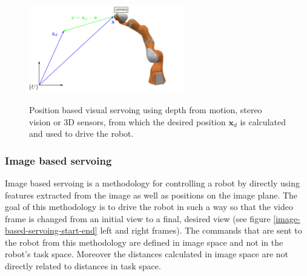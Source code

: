 \begin{center}
\begin{figure}[H]
\centering
\includegraphics[width=0.6\textwidth]{images/visual-servoing-position-based2.png}\\
\caption{Position based visual servoing using depth from motion, stereo vision or 3D sensors, from which the desired position $\mathbf{x}_d$ is calculated and 
used to drive the robot.}
\end{figure}
\end{center}

\subsubsection{Image based servoing}

Image based servoing is a methodology for controlling a robot by directly using features extracted from the image as well as positions on the image plane. The goal of this methodology is 
to drive the robot in such a way so that the video frame is changed from an initial view to a final, desired view (see figure \ref{image-based-servoing-start-end} left and right frames). The commands 
that are sent to the robot from this methodology are defined in image space and not in the robot's task space. Moreover the distances calculated in image space are not directly related to distances 
in task space.

